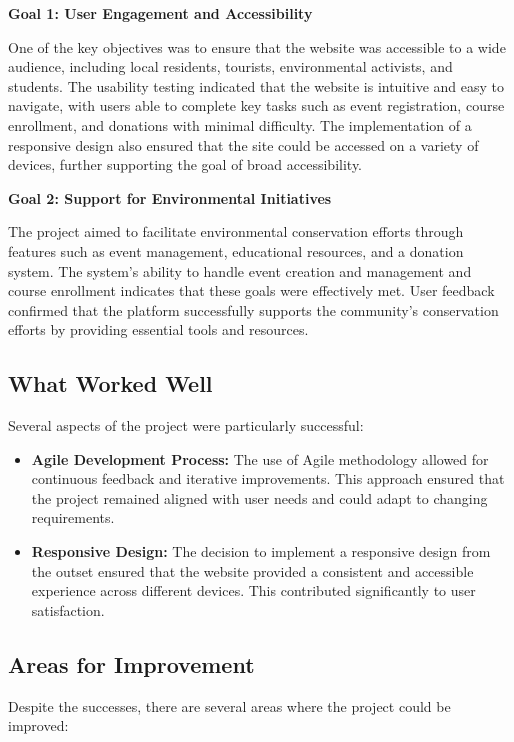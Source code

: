 \textbf{Goal 1: User Engagement and Accessibility}

One of the key objectives was to ensure that the website was accessible to a wide audience, including local residents, tourists, environmental activists, and students. The usability testing indicated that the website is intuitive and easy to navigate, with users able to complete key tasks such as event registration, course enrollment, and donations with minimal difficulty. The implementation of a responsive design also ensured that the site could be accessed on a variety of devices, further supporting the goal of broad accessibility.

\textbf{Goal 2: Support for Environmental Initiatives}

The project aimed to facilitate environmental conservation efforts through features such as event management, educational resources, and a donation system. The system’s ability to handle event creation and management and course enrollment indicates that these goals were effectively met. User feedback confirmed that the platform successfully supports the community's conservation efforts by providing essential tools and resources.

\subsection{What Worked Well}

Several aspects of the project were particularly successful:

\begin{itemize}
    \item \textbf{Agile Development Process:} The use of Agile methodology allowed for continuous feedback and iterative improvements. This approach ensured that the project remained aligned with user needs and could adapt to changing requirements.
    \item \textbf{Responsive Design:} The decision to implement a responsive design from the outset ensured that the website provided a consistent and accessible experience across different devices. This contributed significantly to user satisfaction.
\end{itemize}

\subsection{Areas for Improvement}

Despite the successes, there are several areas where the project could be improved:

